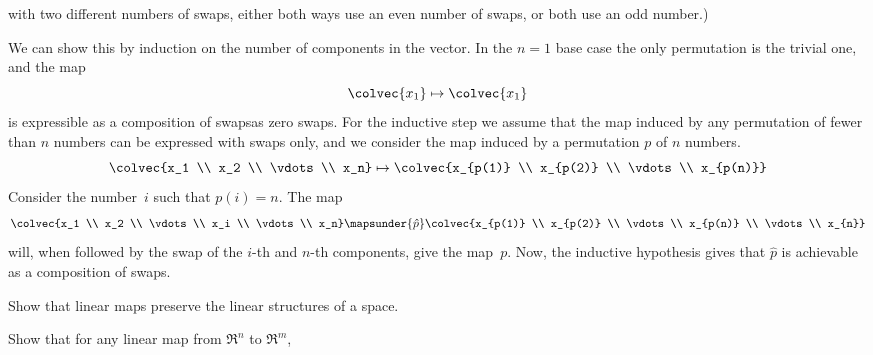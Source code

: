 \begin{exercises}
    with two different numbers of swaps, either both ways use an even number of
    swaps, or both use an odd number.)
    \begin{answer}
      We can show this by induction on the number of components in the 
      vector.
      In the $n=1$ base case the only permutation is the trivial one,
      and the map
      \begin{equation*}
        \colvec{x_1}
        \mapsto
        \colvec{x_1}
      \end{equation*}
      is expressible as a composition of swaps\Dash as zero swaps.
      For the inductive step we assume that the map induced by 
      any permutation of fewer than
      $n$ numbers can be expressed with swaps only, and we consider the map
      induced by a 
      permutation $p$ of $n$ numbers.
      \begin{equation*}
        \colvec{x_1 \\ x_2 \\ \vdots \\ x_n}
        \mapsto
        \colvec{x_{p(1)} \\ x_{p(2)} \\ \vdots \\ x_{p(n)}}
      \end{equation*}
      Consider the number~$i$ such that $p(i)=n$.
      The map      
      \begin{equation*}
        \colvec{x_1      \\ x_2      \\ \vdots \\ x_i      \\ \vdots \\ x_n}
        \mapsunder{\hat{p}}
        \colvec{x_{p(1)} \\ x_{p(2)} \\ \vdots \\ x_{p(n)} \\ \vdots  \\ x_{n}}
      \end{equation*}
      will, when followed by the swap of the $i$-th and $n$-th components, 
      give the map~$p$.
      Now, the inductive hypothesis gives that $\hat{p}$ is achievable as 
      a composition of swaps.
    \end{answer}
  \item \label{exer:ImageLinSurIsLinSur} 
    Show that linear maps preserve the linear structures of a space.
    \begin{exparts}
      \partsitem Show that for any linear map from $\Re^n$ to $\Re^m$,

\end{exparts}
\end{exercises}
